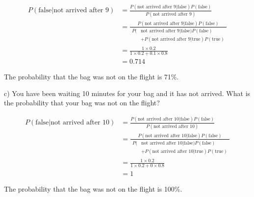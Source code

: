 \documentclass[
  letterpaper,
  DIV=11,
  numbers=noendperiod]{scrreprt}
\begin{document}
\begin{tcolorbox}[enhanced jigsaw, title=\textcolor{quarto-callout-tip-color}{\faLightbulb}\hspace{0.5em}{Answer}, toprule=.15mm, colback=white, breakable, titlerule=0mm, colframe=quarto-callout-tip-color-frame, coltitle=black, opacityback=0, rightrule=.15mm, colbacktitle=quarto-callout-tip-color!10!white, bottomtitle=1mm, opacitybacktitle=0.6, arc=.35mm, bottomrule=.15mm, toptitle=1mm, leftrule=.75mm, left=2mm]

\begin{align*}
P(\text{false}|\text{not arrived after 9})&=\frac{P(\text{not arrived after 9}|\text{false})P(\text{false})}{P(\text{not arrived after 9})} \\[12pt]
&=\frac{P(\text{not arrived after 9}|\text{false})P(\text{false})}{\begin{aligned}P(&\text{not arrived after 9}|\text{false})P(\text{false})\\&+P(\text{not arrived after 9}|\text{true})P(\text{true})\end{aligned}} \\[12pt]
&=\frac{1\times 0.2}{1\times 0.2+0.1\times 0.8} \\[12pt]
&=0.714
\end{align*}

The probability that the bag was not on the flight is 71\%.

\end{tcolorbox}

c) You have been waiting 10 minutes for your bag and it has not arrived.
What is the probability that your bag was not on the flight?

\begin{tcolorbox}[enhanced jigsaw, title=\textcolor{quarto-callout-tip-color}{\faLightbulb}\hspace{0.5em}{Answer}, toprule=.15mm, colback=white, breakable, titlerule=0mm, colframe=quarto-callout-tip-color-frame, coltitle=black, opacityback=0, rightrule=.15mm, colbacktitle=quarto-callout-tip-color!10!white, bottomtitle=1mm, opacitybacktitle=0.6, arc=.35mm, bottomrule=.15mm, toptitle=1mm, leftrule=.75mm, left=2mm]

\begin{align*}
P(\text{false}|\text{not arrived after 10})&=\frac{P(\text{not arrived after 10}|\text{false})P(\text{false})}{P(\text{not arrived after 10})} \\[12pt]
&=\frac{P(\text{not arrived after 10}|\text{false})P(\text{false})}{\begin{aligned}P(&\text{not arrived after 10}|\text{false})P(\text{false})\\&+P(\text{not arrived after 10}|\text{true})P(\text{true})\end{aligned}} \\[12pt]
&=\frac{1\times 0.2}{1\times 0.2+0\times 0.8} \\[12pt]
&=1
\end{align*}

The probability that the bag was not on the flight is 100\%.

\end{tcolorbox}
\end{document}
